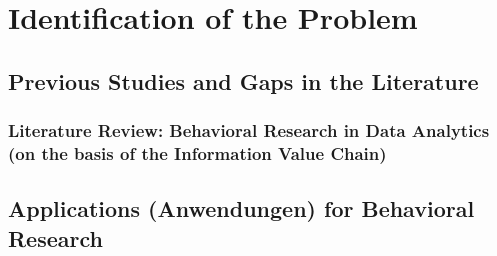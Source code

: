 \newpage\section{Identification of the Problem}

\subsection{Previous Studies and Gaps in the Literature}

\subsubsection{Literature Review: Behavioral Research in Data Analytics (on the basis of the Information Value Chain)}

\subsection{Applications (Anwendungen) for Behavioral Research}